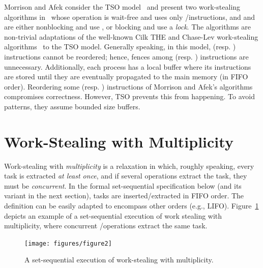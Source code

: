 Morrison and Afek consider the TSO model~\cite{DBLP_journals_cacm_SewellSONM10} and present two work-stealing algorithms in~\cite{fencefreework} whose \Put operation is wait-free and uses only \R/\W instructions,  and \Take and \Steal are either nonblocking and use \CAS, or blocking and use a \emph{lock}.  The algorithms are non-trivial adaptations of the well-known Cilk THE and Chase-Lev work-stealing algorithms~\cite{circular.work.stealing, FLR98} to the TSO model.  Generally speaking, in this model, \W (resp. \R) instructions cannot be reordered; hence, fences among \W (resp. \R) instructions are unnecessary. Additionally, each process has a local buffer where its \W instructions are stored until they are eventually propagated to the main memory (in FIFO order).  Reordering some \W (resp. \R) instructions of Morrison and Afek's algorithms compromises correctness. However, TSO prevents this from happening.  To avoid \RAW patterns, they assume bounded size \W buffers.

\section{\label{sec-ws-mult}Work-Stealing with Multiplicity}

Work-stealing with \emph{multiplicity} is a relaxation in which, roughly speaking, every task is extracted \emph{at least once}, and if several operations extract the task, they must be \emph{concurrent}.  In the formal set-sequential specification below (and its variant in the next section), tasks are inserted/extracted in FIFO order.  The definition can be easily adapted to encompass other orders (e.g., LIFO).  Figure~\ref{fig-example-execution} depicts an example of a set-sequential execution of work stealing with multiplicity, where concurrent \Take/\Steal operations extract the same task.

\begin{figure}[ht]
  \begin{center}
    \texttt{[image: figures/figure2]}
    \caption{\label{fig-example-execution}A set-sequential execution
      of work-stealing with multiplicity.}
  \end{center}
\end{figure}

